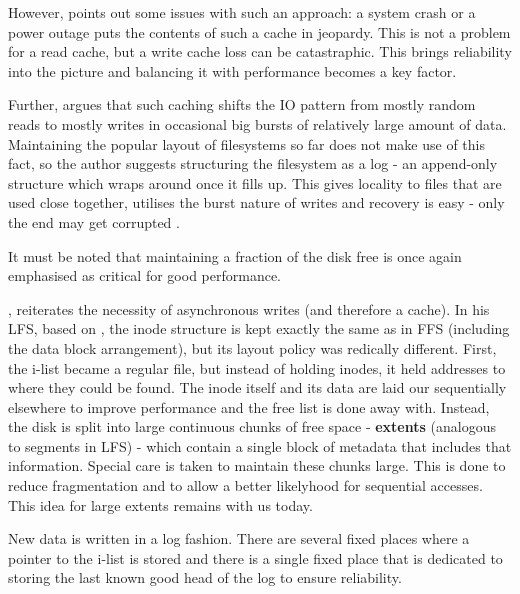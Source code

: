             However, \citeauthor{IO_bottleneck} points out some issues with
            such an approach: a system crash or a power outage puts the
            contents of such a cache in jeopardy. This is not a problem for a
            read cache, but a write cache loss can be catastraphic. This brings
            reliability into the picture and balancing it with performance
            becomes a key factor.

            Further, \citeauthor{IO_bottleneck} argues that such caching shifts
            the IO pattern from mostly random reads to mostly writes in
            occasional big bursts of relatively large amount of data.
            Maintaining the popular layout of filesystems so far does not make
            use of this fact, so the author suggests structuring the filesystem
            as a log - an append-only structure which wraps around once it
            fills up. This gives locality to files that are used close
            together, utilises the burst nature of writes and recovery is easy
            - only the end may get corrupted \cite{IO_bottleneck}.

            It must be noted that maintaining a fraction of the disk free is
            once again emphasised as critical for good performance. %

            \citeauthor{LFS}, reiterates the necessity of asynchronous writes
            (and therefore a cache). In his LFS, based on \cite{IO_bottleneck},
            the inode structure is kept exactly the same as in FFS (including
            the data block arrangement), but its layout policy was redically
            different. First, the i-list became a regular file, but instead of
            holding inodes, it held addresses to where they could be found. The
            inode itself and its data are laid our sequentially elsewhere to
            improve performance and the free list is done away with. Instead,
            the disk is split into large continuous chunks of free space -
            \textbf{extents} (analogous to segments in LFS) - which contain a
            single block of metadata that includes that information.  Special
            care is taken to maintain these chunks large. This is done to
            reduce fragmentation and to allow a better likelyhood for
            sequential accesses. This idea for large extents remains with us
            today.

            New data is written in a log fashion. There are several fixed
            places where a pointer to the i-list is stored and there is a
            single fixed place that is dedicated to storing the last known good
            head of the log to ensure reliability.

